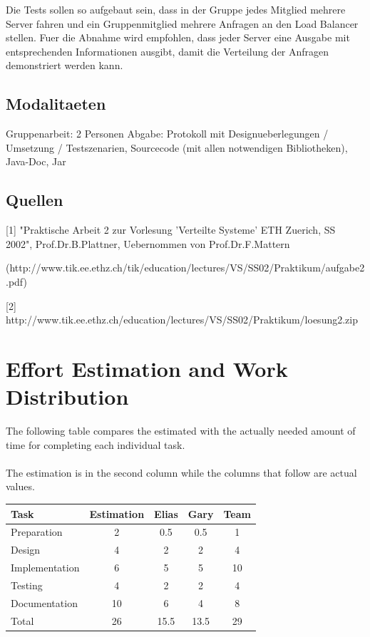 \documentclass[11pt, a4paper]{article}
\begin{document}
Die Tests sollen so aufgebaut sein, dass in der Gruppe jedes Mitglied
mehrere Server fahren und ein Gruppenmitglied mehrere Anfragen an den
Load Balancer stellen. Fuer die Abnahme wird empfohlen, dass jeder
Server eine Ausgabe mit entsprechenden Informationen ausgibt, damit
die Verteilung der Anfragen demonstriert werden kann.

\subsection{Modalitaeten}

Gruppenarbeit: 2 Personen Abgabe: Protokoll mit Designueberlegungen /
Umsetzung / Testszenarien, Sourcecode (mit allen notwendigen
Bibliotheken), Java-Doc, Jar

\subsection{Quellen}

[1] "Praktische Arbeit 2 zur Vorlesung 'Verteilte Systeme' ETH
Zuerich, SS 2002", Prof.Dr.B.Plattner, Uebernommen von
Prof.Dr.F.Mattern

(http://www.tik.ee.ethz.ch/tik/education/lectures/VS/SS02/Praktikum/aufgabe2.pdf)

[2] http://www.tik.ee.ethz.ch/education/lectures/VS/SS02/Praktikum/loesung2.zip

\newpage

\section{Effort Estimation and Work Distribution}

The following table compares the estimated with the actually needed
amount of time for completing each individual task.
\\\\
The estimation is in the second column while the columns that follow
are actual values.

\parskip 12pt
\begin{tabular} {| l | c | c | c | c |}
	\hline
	Task					&	Estimation		& 	Elias 	& 	Gary 	& 	Team	\\ \hline \hline
	Preparation				&	2				&	0.5		&  	0.5		&	1		\\ \hline
	Design					&	4				&	2		&	2		&	4		\\ \hline
	Implementation			&	6				&	5		&	5		& 	10 		\\ \hline
	Testing					&	4				&	2		& 	2		& 	4 		\\ \hline
	Documentation			&	10				&	6		&	4		& 	8		\\ \hline 
	Total					&	26				&	15.5	&	13.5	& 	29		\\
	\hline
\end{tabular}
\end{document}

